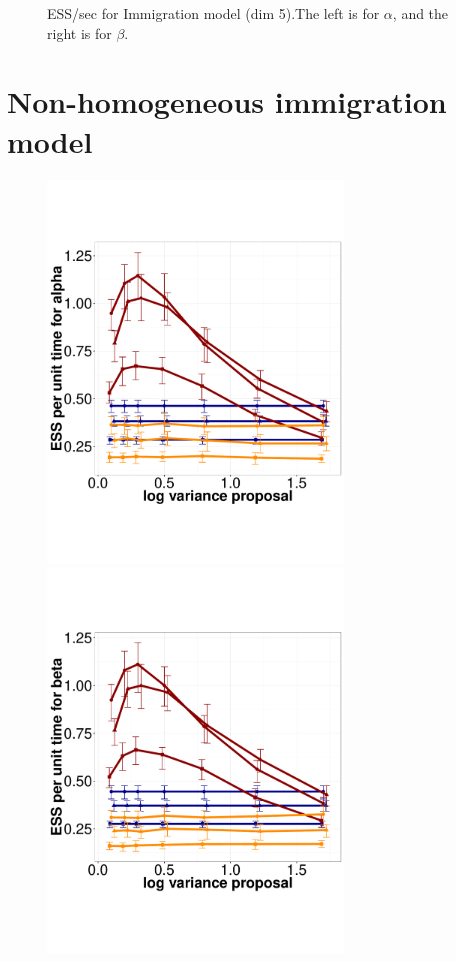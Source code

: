 \begin{figure}
\begin{minipage}[hp]{0.45\linewidth}
    \vspace{-0 in}
      \label{fig:ESS_Q_D5}
  \end{minipage}
    \caption{ESS/sec for Immigration model (dim 5).The left is for $\alpha$, and the right is for $\beta$.}
  \end{figure}

\section{Non-homogeneous immigration model}

  \begin{figure}%
  \centering
  \begin{minipage}[!hp]{0.45\linewidth}
  \centering
    \includegraphics [width=0.70\textwidth, angle=0]{figs/pc_5_alpha.pdf}
      \end{minipage}
  \begin{minipage}[!hp]{0.45\linewidth}
  \centering
    \includegraphics [width=0.70\textwidth, angle=0]{figs/pc_5_beta.pdf}

\end{minipage}
\end{figure}
